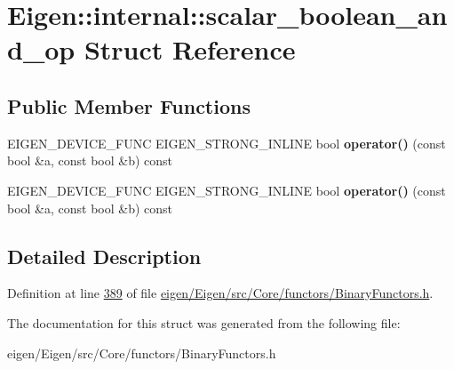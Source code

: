 \hypertarget{struct_eigen_1_1internal_1_1scalar__boolean__and__op}{}\section{Eigen\+:\+:internal\+:\+:scalar\+\_\+boolean\+\_\+and\+\_\+op Struct Reference}
\label{struct_eigen_1_1internal_1_1scalar__boolean__and__op}
\subsection*{Public Member Functions}
\begin{DoxyCompactItemize}
\item 
\mbox{\label{struct_eigen_1_1internal_1_1scalar__boolean__and__op_a61bd564952d2be227b136762bd70d403}} 
E\+I\+G\+E\+N\+\_\+\+D\+E\+V\+I\+C\+E\+\_\+\+F\+U\+NC E\+I\+G\+E\+N\+\_\+\+S\+T\+R\+O\+N\+G\+\_\+\+I\+N\+L\+I\+NE bool {\bfseries operator()} (const bool \&a, const bool \&b) const
\item 
\mbox{\label{struct_eigen_1_1internal_1_1scalar__boolean__and__op_a61bd564952d2be227b136762bd70d403}} 
E\+I\+G\+E\+N\+\_\+\+D\+E\+V\+I\+C\+E\+\_\+\+F\+U\+NC E\+I\+G\+E\+N\+\_\+\+S\+T\+R\+O\+N\+G\+\_\+\+I\+N\+L\+I\+NE bool {\bfseries operator()} (const bool \&a, const bool \&b) const
\end{DoxyCompactItemize}


\subsection{Detailed Description}


Definition at line \hyperlink{eigen_2_eigen_2src_2_core_2functors_2_binary_functors_8h_source_l00389}{389} of file \hyperlink{eigen_2_eigen_2src_2_core_2functors_2_binary_functors_8h_source}{eigen/\+Eigen/src/\+Core/functors/\+Binary\+Functors.\+h}.



The documentation for this struct was generated from the following file\+:\begin{DoxyCompactItemize}
\item 
eigen/\+Eigen/src/\+Core/functors/\+Binary\+Functors.\+h\end{DoxyCompactItemize}
